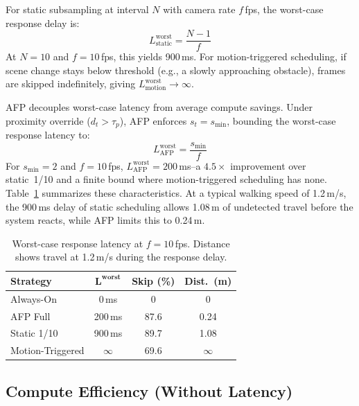 \documentclass[conference]{IEEEtran}
\begin{document}
For static subsampling at interval $N$ with camera rate $f$\,fps,
the worst-case response delay is:
\begin{equation}
  L_\text{static}^\text{worst} = \frac{N - 1}{f}
  \label{eq:static_latency}
\end{equation}
At $N{=}10$ and $f{=}10$\,fps, this yields 900\,ms. For
motion-triggered scheduling, if scene change stays below threshold
(e.g., a slowly approaching obstacle), frames are skipped
indefinitely, giving $L_\text{motion}^\text{worst} \to \infty$.

AFP decouples worst-case latency from average compute savings.
Under proximity override ($d_t > \tau_p$), AFP enforces
$s_t = s_\text{min}$, bounding the worst-case response latency to:
\begin{equation}
  L_\text{AFP}^\text{worst} = \frac{s_\text{min}}{f}
  \label{eq:afp_latency}
\end{equation}
For $s_\text{min}{=}2$ and $f{=}10$\,fps,
$L_\text{AFP}^\text{worst} = 200$\,ms--a $4.5\times$ improvement
over static~1/10 and a finite bound where motion-triggered
scheduling has none. Table~\ref{tab:latency_bounds} summarizes
these characteristics. At a typical walking speed of 1.2\,m/s, the
900\,ms delay of static scheduling allows 1.08\,m of undetected
travel before the system reacts, while AFP limits this to 0.24\,m.

\begin{table}[t]
  \centering
  \caption{Worst-case response latency at $f{=}10$\,fps.
    Distance shows travel at 1.2\,m/s during the response delay.}
  \label{tab:latency_bounds}
  \begin{tabular}{@{}lccc@{}}
    \toprule
    \textbf{Strategy} & $\boldsymbol{L^\text{worst}}$
      & \textbf{Skip (\%)} & \textbf{Dist.\ (m)} \\
    \midrule
    Always-On        & 0\,ms     & 0     & 0     \\
    AFP Full         & 200\,ms   & 87.6  & 0.24  \\
    Static 1/10      & 900\,ms   & 89.7  & 1.08  \\
    Motion-Triggered & $\infty$  & 69.6  & $\infty$ \\
    \bottomrule
  \end{tabular}
\end{table}

\subsection{Compute Efficiency (Without Latency)}
\label{sec:efficiency}
\end{document}
